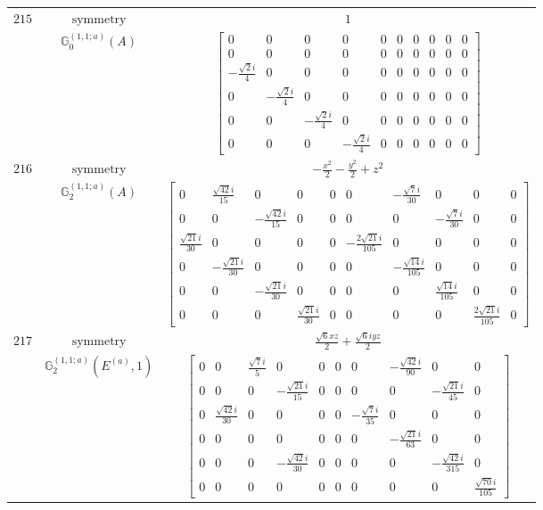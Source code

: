 \documentclass[fleqn,8pt,landscape]{jsarticle}
\begin{document}
\begin{longtable}{ccc}
$ 215 $ & $ \text{symmetry} $ & $ 1 $ \\
$  $ & $ \mathbb{G}_{0}^{(1,1;a)}(A) $ & $ \begin{bmatrix} 0 & 0 & 0 & 0 & 0 & 0 & 0 & 0 & 0 & 0 \\ 0 & 0 & 0 & 0 & 0 & 0 & 0 & 0 & 0 & 0 \\ - \frac{\sqrt{2} i}{4} & 0 & 0 & 0 & 0 & 0 & 0 & 0 & 0 & 0 \\ 0 & - \frac{\sqrt{2} i}{4} & 0 & 0 & 0 & 0 & 0 & 0 & 0 & 0 \\ 0 & 0 & - \frac{\sqrt{2} i}{4} & 0 & 0 & 0 & 0 & 0 & 0 & 0 \\ 0 & 0 & 0 & - \frac{\sqrt{2} i}{4} & 0 & 0 & 0 & 0 & 0 & 0 \end{bmatrix} $ \\ \hline
$ 216 $ & $ \text{symmetry} $ & $ - \frac{x^{2}}{2} - \frac{y^{2}}{2} + z^{2} $ \\
$  $ & $ \mathbb{G}_{2}^{(1,1;a)}(A) $ & $ \begin{bmatrix} 0 & \frac{\sqrt{42} i}{15} & 0 & 0 & 0 & 0 & - \frac{\sqrt{7} i}{30} & 0 & 0 & 0 \\ 0 & 0 & - \frac{\sqrt{42} i}{15} & 0 & 0 & 0 & 0 & - \frac{\sqrt{7} i}{30} & 0 & 0 \\ \frac{\sqrt{21} i}{30} & 0 & 0 & 0 & 0 & - \frac{2 \sqrt{21} i}{105} & 0 & 0 & 0 & 0 \\ 0 & - \frac{\sqrt{21} i}{30} & 0 & 0 & 0 & 0 & - \frac{\sqrt{14} i}{105} & 0 & 0 & 0 \\ 0 & 0 & - \frac{\sqrt{21} i}{30} & 0 & 0 & 0 & 0 & \frac{\sqrt{14} i}{105} & 0 & 0 \\ 0 & 0 & 0 & \frac{\sqrt{21} i}{30} & 0 & 0 & 0 & 0 & \frac{2 \sqrt{21} i}{105} & 0 \end{bmatrix} $ \\ \hline
$ 217 $ & $ \text{symmetry} $ & $ \frac{\sqrt{6} x z}{2} + \frac{\sqrt{6} i y z}{2} $ \\
$  $ & $ \mathbb{G}_{2}^{(1,1;a)}(E^{(a)},1) $ & $ \begin{bmatrix} 0 & 0 & \frac{\sqrt{7} i}{5} & 0 & 0 & 0 & 0 & - \frac{\sqrt{42} i}{90} & 0 & 0 \\ 0 & 0 & 0 & - \frac{\sqrt{21} i}{15} & 0 & 0 & 0 & 0 & - \frac{\sqrt{21} i}{45} & 0 \\ 0 & \frac{\sqrt{42} i}{30} & 0 & 0 & 0 & 0 & - \frac{\sqrt{7} i}{35} & 0 & 0 & 0 \\ 0 & 0 & 0 & 0 & 0 & 0 & 0 & - \frac{\sqrt{21} i}{63} & 0 & 0 \\ 0 & 0 & 0 & - \frac{\sqrt{42} i}{30} & 0 & 0 & 0 & 0 & - \frac{\sqrt{42} i}{315} & 0 \\ 0 & 0 & 0 & 0 & 0 & 0 & 0 & 0 & 0 & \frac{\sqrt{70} i}{105} \end{bmatrix} $ \\ \hline

\end{longtable}
\end{document}
